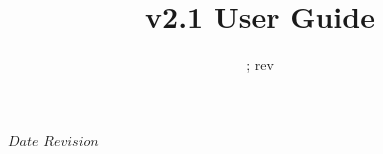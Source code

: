 



\newcommand{\Atmosphere}{\texttt{Atmosphere}}
\newcommand{\Cloud}{\texttt{Cloud}}
\newcommand{\Aerosol}{\texttt{Aerosol}}
\newcommand{\Surface}{\texttt{Surface}}
\newcommand{\Geometry}{\texttt{Geometry}}
\newcommand{\GeometryInfo}{\texttt{GeometryInfo}}
\newcommand{\ChannelInfo}{\texttt{ChannelInfo}}
\newcommand{\Options}{\texttt{Options}}
\newcommand{\SSUInput}{\texttt{SSU\_Input}}
\newcommand{\ZeemanInput}{\texttt{Zeeman\_Input}}
\newcommand{\AtmOptics}{\texttt{AtmOptics}}
\newcommand{\SfcOptics}{\texttt{SfcOptics}}
\newcommand{\RTSolution}{\texttt{RTSolution}}
\newcommand{\SensorData}{\texttt{SensorData}}
\newcommand{\AtmAbsorption}{\texttt{AtmAbsorption}}
\newcommand{\AtmScatter}{\texttt{AtmScatter}}
\newcommand{\CloudScatter}{\texttt{CloudScatter}}
\newcommand{\AerosolScatter}{\texttt{AerosolScatter}}
\newcommand{\SpcCoeff}{\texttt{SpcCoeff}}
\newcommand{\f}[1]{\texttt{#1}}
\newcommand{\tblhd}[1]{\sffamily\textbf{#1}}

\newcommand{\inarg}[1]{\f{\textcolor{green}{#1}}}
\newcommand{\outarg}[1]{\f{\textcolor{red}{#1}}}
\newcommand{\optarg}[1]{\f{\textit{#1}}}

\newcommand{\dstar}{\ensuremath{\delta^{*}\!}}
\newcommand{\radunit}{mW/(m\ensuremath{^2}.sr.\invcm)}
\newcommand{\ticket}[1]{\href{https://svnemc.ncep.noaa.gov/trac/crtm/ticket/#1}{{#1}}}

\SVN $Date$
\SVN $Revision$

\title{v2.1 User Guide}
\date{\SVNDate ; rev\SVNRevision}



\maketitle

\draftwatermark

